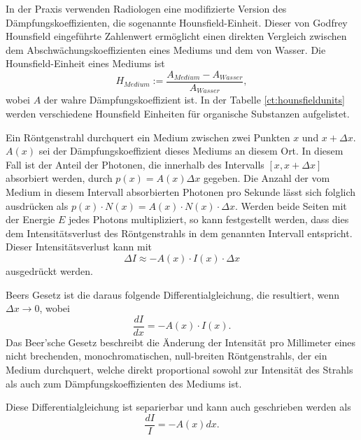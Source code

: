In der Praxis verwenden Radiologen eine modifizierte Version des Dämpfungskoeffizienten, die sogenannte Hounsfield-Einheit. Dieser von Godfrey Hounsfield eingeführte Zahlenwert ermöglicht einen direkten Vergleich zwischen dem Abschwächungskoeffizienten eines Mediums und dem von Wasser. Die Hounsfield-Einheit eines Mediums ist
\begin{equation}
	H_{Medium} := \dfrac{A_{Medium}-A_{Wasser}}{A_{Wasser}},
\end{equation}
wobei $A$ der wahre Dämpfungskoeffizient ist. In der Tabelle \ref{ct:hounsfieldunits} werden verschiedene Hounsfield Einheiten für organische Substanzen aufgelistet.

Ein Röntgenstrahl durchquert ein Medium zwischen zwei Punkten $x$ und $x + \Delta x$. $A(x)$ sei der Dämpfungskoeffizient dieses Mediums an diesem Ort. In diesem Fall ist der Anteil der Photonen, die innerhalb des Intervalls $[x, x + \Delta x]$ absorbiert werden, durch $p(x) = A(x)\Delta x$ gegeben. Die Anzahl der vom Medium in diesem Intervall absorbierten Photonen pro Sekunde lässt sich folglich ausdrücken als $p(x) \cdot N(x) = A(x) \cdot N(x) \cdot \Delta x$. Werden beide Seiten mit der Energie $E$ jedes Photons multipliziert, so kann festgestellt werden, dass dies dem Intensitätsverlust des Röntgenstrahls in dem genannten Intervall entspricht. Dieser Intensitätsverlust kann mit 
\begin{equation}
	\Delta I \approx -A(x) \cdot I(x) \cdot \Delta x
\end{equation}
ausgedrückt werden.

Beers Gesetz ist die daraus folgende Differentialgleichung, die resultiert, wenn $\Delta x \rightarrow 0$, wobei 
\begin{equation}
	\dfrac{dI}{dx} = -A(x)\cdot I(x).
\end{equation}
Das Beer'sche Gesetz beschreibt die Änderung der Intensität pro Millimeter eines nicht brechenden, monochromatischen, null-breiten Röntgenstrahls, der ein Medium durchquert, welche direkt proportional sowohl zur Intensität des Strahls als auch zum Dämpfungskoeffizienten des Mediums ist.

Diese Differentialgleichung ist separierbar und kann auch geschrieben werden als
\begin{equation}
	\dfrac{dI}{I} = -A(x)dx.
\end{equation}

